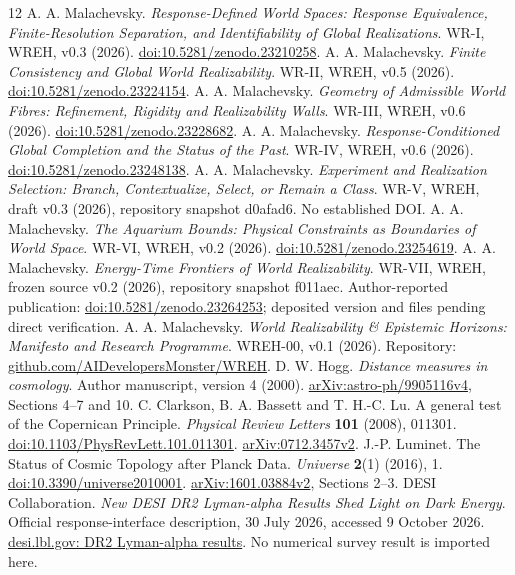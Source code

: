 \begingroup\small\raggedright
\begin{thebibliography}{12}\setlength{\itemsep}{2pt}\setlength{\parsep}{0pt}
 A. A. Malachevsky. \emph{Response-Defined World Spaces: Response Equivalence, Finite-Resolution Separation, and Identifiability of Global Realizations}. WR-I, WREH, v0.3 (2026). \href{https://doi.org/10.5281/zenodo.23210258}{doi:10.5281/zenodo.23210258}.
 A. A. Malachevsky. \emph{Finite Consistency and Global World Realizability}. WR-II, WREH, v0.5 (2026). \href{https://doi.org/10.5281/zenodo.23224154}{doi:10.5281/zenodo.23224154}.
 A. A. Malachevsky. \emph{Geometry of Admissible World Fibres: Refinement, Rigidity and Realizability Walls}. WR-III, WREH, v0.6 (2026). \href{https://doi.org/10.5281/zenodo.23228682}{doi:10.5281/zenodo.23228682}.
 A. A. Malachevsky. \emph{Response-Conditioned Global Completion and the Status of the Past}. WR-IV, WREH, v0.6 (2026). \href{https://doi.org/10.5281/zenodo.23248138}{doi:10.5281/zenodo.23248138}.
 A. A. Malachevsky. \emph{Experiment and Realization Selection: Branch, Contextualize, Select, or Remain a Class}. WR-V, WREH, draft v0.3 (2026), repository snapshot d0afad6. No established DOI.
 A. A. Malachevsky. \emph{The Aquarium Bounds: Physical Constraints as Boundaries of World Space}. WR-VI, WREH, v0.2 (2026). \href{https://doi.org/10.5281/zenodo.23254619}{doi:10.5281/zenodo.23254619}.
 A. A. Malachevsky. \emph{Energy-Time Frontiers of World Realizability}. WR-VII, WREH, frozen source v0.2 (2026), repository snapshot f011aec. Author-reported publication: \href{https://doi.org/10.5281/zenodo.23264253}{doi:10.5281/zenodo.23264253}; deposited version and files pending direct verification.
 A. A. Malachevsky. \emph{World Realizability \& Epistemic Horizons: Manifesto and Research Programme}. WREH-00, v0.1 (2026). Repository: \href{https://github.com/AIDevelopersMonster/WREH}{github.com/AIDevelopersMonster/WREH}.
 D. W. Hogg. \emph{Distance measures in cosmology}. Author manuscript, version 4 (2000). \href{https://arxiv.org/abs/astro-ph/9905116v4}{arXiv:astro-ph/9905116v4}, Sections 4--7 and 10.
 C. Clarkson, B. A. Bassett and T. H.-C. Lu. A general test of the Copernican Principle. \emph{Physical Review Letters} \textbf{101} (2008), 011301. \href{https://doi.org/10.1103/PhysRevLett.101.011301}{doi:10.1103/PhysRevLett.101.011301}. \href{https://arxiv.org/abs/0712.3457v2}{arXiv:0712.3457v2}.
 J.-P. Luminet. The Status of Cosmic Topology after Planck Data. \emph{Universe} \textbf{2}(1) (2016), 1. \href{https://doi.org/10.3390/universe2010001}{doi:10.3390/universe2010001}. \href{https://arxiv.org/abs/1601.03884v2}{arXiv:1601.03884v2}, Sections 2--3.
 DESI Collaboration. \emph{New DESI DR2 Lyman-alpha Results Shed Light on Dark Energy}. Official response-interface description, 30 July 2026, accessed 9 October 2026. \href{https://www.desi.lbl.gov/2026/07/30/new-desi-dr2-lyman-alpha-results-shed-light-on-dark-energy/}{desi.lbl.gov: DR2 Lyman-alpha results}. No numerical survey result is imported here.
\end{thebibliography}\endgroup
